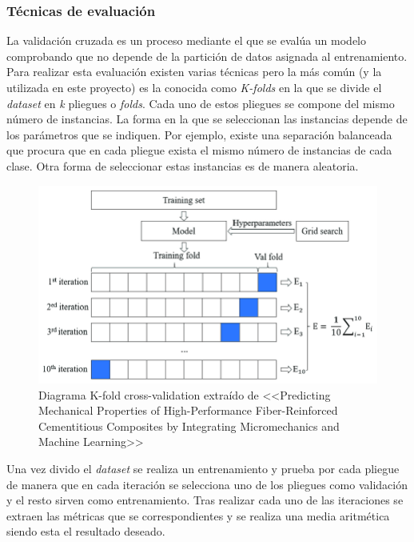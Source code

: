 \subsubsection{Técnicas de evaluación}
La validación cruzada es un proceso mediante el que se evalúa un modelo comprobando que no depende de la partición de datos asignada al entrenamiento. Para realizar esta evaluación existen varias técnicas pero la más común (y la utilizada en este proyecto) es la conocida como \textit{K-folds} en la que se divide el \textit{dataset} en \textit{k} pliegues o \textit{folds}. Cada uno de estos pliegues se compone del mismo número de instancias. La forma en la que se seleccionan las instancias depende de los parámetros que se indiquen. Por ejemplo, existe una separación balanceada que procura que en cada pliegue exista el mismo número de instancias de cada clase. Otra forma de seleccionar estas instancias es de manera aleatoria.
\begin{figure}[h]

	\label{img:k-fold}
	\centering
	\includegraphics[scale=0.5]{./img/concepts/K-Fold.png}
	\caption{Diagrama K-fold cross-validation extraído de <<Predicting Mechanical Properties of High-Performance Fiber-Reinforced Cementitious Composites by Integrating Micromechanics and Machine Learning>>~\cite{Guo2021}}
\end{figure}

Una vez divido el \textit{dataset} se realiza un entrenamiento y prueba por cada pliegue de manera que en cada iteración se selecciona uno de los pliegues como validación y el resto sirven como entrenamiento. Tras realizar cada uno de las iteraciones se extraen las métricas que se correspondientes y se realiza una media aritmética siendo esta el resultado deseado.



